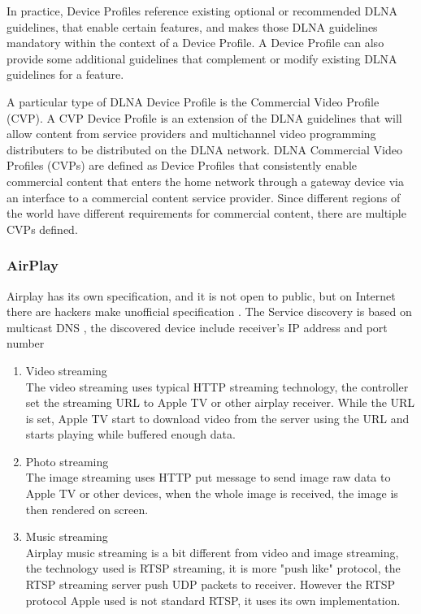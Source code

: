 \begin{enumerate}
In practice, Device Profiles reference existing optional or recommended DLNA guidelines, that enable 
certain features, and makes those DLNA guidelines mandatory within the context of a Device Profile. 
A Device Profile can also provide some additional guidelines that complement or modify existing DLNA 
guidelines for a feature.

A particular type of DLNA Device Profile is the Commercial Video Profile (CVP). A CVP Device Profile 
is an extension of the DLNA guidelines that will allow content from service providers and multichannel 
video programming distributers to be distributed on the DLNA network. DLNA Commercial Video Profiles 
(CVPs) are defined as Device Profiles that consistently enable commercial content that enters the home 
network through a gateway device via an interface to a commercial content service provider. Since 
different regions of the world have different requirements for commercial content, there are multiple 
CVPs defined.

\end{enumerate}

\subsubsection{AirPlay}
Airplay has its own specification, and it is not open to public, but on Internet there are hackers 
make unofficial specification \cite{airplay-spec}. The Service discovery is
based on multicast DNS \cite{multicastdns}, the discovered device include receiver's IP address and
port number
\begin{enumerate}
\item Video streaming \\
The video streaming uses typical HTTP streaming technology, the controller set the streaming URL 
to Apple TV or other airplay receiver. While the URL is set, Apple TV start to download video from 
the server using the URL and starts playing while buffered enough data.
\item Photo streaming \\
The image streaming uses HTTP put message to send image raw data to Apple TV or other devices, when 
the whole image is received, the image is then rendered on screen.
\item Music streaming \\
Airplay music streaming is a bit different from video and image streaming, the
technology used is RTSP streaming, it is more "push like" protocol, the RTSP
streaming server push UDP packets to receiver. However the RTSP protocol Apple
used is not standard RTSP, it uses its own implementation.
\end{enumerate}
